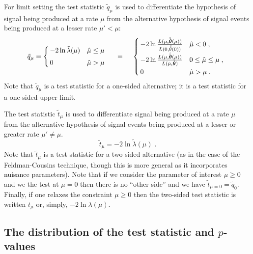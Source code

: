 \documentclass{cernrep}
\def\vec#1{\ifmmode
\mathchoice{\mbox{\boldmath$\displaystyle\bf#1$}}
{\mbox{\boldmath$\textstyle\bf#1$}}
{\mbox{\boldmath$\scriptstyle\bf#1$}}
{\mbox{\boldmath$\scriptscriptstyle\bf#1$}}\else
{\mbox{\boldmath$\bf#1$}}\fi}
\begin{document}
For limit setting the test statistic $\tilde{q}_{\mu}$ is used to differentiate the hypothesis of signal being produced at a rate $\mu$ from the alternative hypothesis of signal events being produced at a lesser rate $\mu'<\mu$:
\begin{equation}
\label{eq:qmutilde}  
\tilde{q}_{\mu} =  \left\{ \!
\! \begin{array}{ll} - 2 \ln \tilde{\lambda}(\mu)  & \hat{\mu} \le \mu
\\*[0.2 cm] 0 & \hat{\mu} > \mu 
              \end{array} \right.  \quad = \quad \: \left\{ \!
\! \begin{array}{lll} - 2 \ln \frac{L(\mu,
\hat{\hat{\vec{\theta}}}(\mu))} {L(0, \hat{\hat{\theta}}(0))}   &
\hat{\mu} < 0 \;, \\*[0.2 cm] -2 \ln \frac{L(\mu,
\hat{\hat{\vec{\theta}}}(\mu))} {L(\hat{\mu}, \hat{\vec{\theta}})} &
0 \le \hat{\mu} \le \mu  \;, \\*[0.2 cm] 0 & \hat{\mu} > \mu \;.
              \end{array} \right.
\end{equation}
Note that $\tilde{q}_{\mu}$ is a test statistic for a one-sided alternative; it is a test statistic for a one-sided upper limit. 

The test statistic $\tilde{t}_\mu$ is used to differentiate signal being produced at a rate $\mu$ from the alternative hypothesis of signal events being produced at a lesser or greater rate $\mu' \ne\mu$.
\begin{equation}
\label{eq:tmu}
\tilde{t}_{\mu} =  - 2 \ln \tilde{\lambda}(\mu)   \; .  
\end{equation}
Note that $\tilde{t}_\mu$ is a test statistic for a two-sided alternative (as in the case of the Feldman-Cousins technique, though this is more general as it incorporates nuisance parameters).  Note  that if we consider the parameter of interest $\mu\ge 0$ and we the test at $\mu=0$ then there is no ``other side'' and we have $\tilde{t}_{\mu=0} = \tilde{q}_0$.  Finally, if one relaxes the constraint $\mu\ge0$ then the two-sided test statistic is written $t_\mu$ or, simply, $-2\ln\lambda(\mu)$.

\subsection{The distribution of the test statistic and $p$-values}
\end{document}
